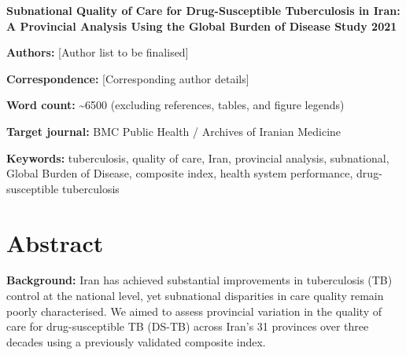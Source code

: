 \documentclass[12pt]{article}
\begin{document}

\begin{titlepage}
\centering
\vspace*{2cm}

{\LARGE\bfseries Subnational Quality of Care for Drug-Susceptible Tuberculosis in Iran: A Provincial Analysis Using the Global Burden of Disease Study 2021\par}

\vspace{2cm}

{\large\textbf{Authors:} [Author list to be finalised]\par}

\vspace{1cm}

{\large\textbf{Correspondence:} [Corresponding author details]\par}

\vspace{1cm}

{\large\textbf{Word count:} \textasciitilde 6500 (excluding references, tables, and figure legends)\par}

\vspace{1cm}

{\large\textbf{Target journal:} BMC Public Health / Archives of Iranian Medicine\par}

\vspace{1cm}

{\large\textbf{Keywords:} tuberculosis, quality of care, Iran, provincial analysis, subnational, Global Burden of Disease, composite index, health system performance, drug-susceptible tuberculosis\par}

\vfill

\end{titlepage}


\section*{Abstract}

\textbf{Background:} Iran has achieved substantial improvements in tuberculosis (TB) control at the national level, yet subnational disparities in care quality remain poorly characterised. We aimed to assess provincial variation in the quality of care for drug-susceptible TB (DS-TB) across Iran's 31 provinces over three decades using a previously validated composite index.
\end{document}
